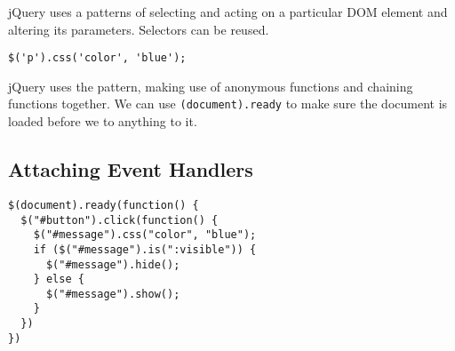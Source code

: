jQuery uses a patterns of selecting and acting on a particular DOM element and altering its parameters.
Selectors can be reused.
\begin{verbatim}
$('p').css('color', 'blue');
\end{verbatim}
jQuery uses the pattern, making use of anonymous functions and chaining functions together.
We can use \texttt{(document).ready} to make sure the document is loaded before we to anything to it.

\subsection{Attaching Event Handlers}\label{sub:attaching_event_handlers}

\begin{verbatim}
$(document).ready(function() {
  $("#button").click(function() {
    $("#message").css("color", "blue");
    if ($("#message").is(":visible")) {
      $("#message").hide();
    } else {
      $("#message").show();   
    }
  })
})
\end{verbatim}

